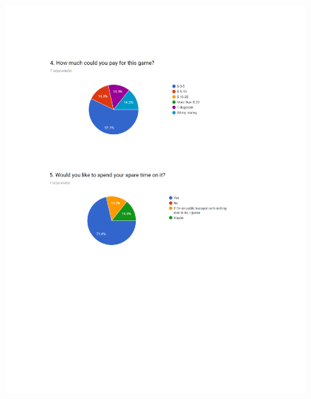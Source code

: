 \documentclass[12p]{article}
\begin{document}
\begin{figure}[ht]
 \center
 \includegraphics[width=\textwidth,height=\textheight,keepaspectratio]{surveyresults2.png}
 \label{fig:survey_results_2}
\end{figure}

\end{document}
